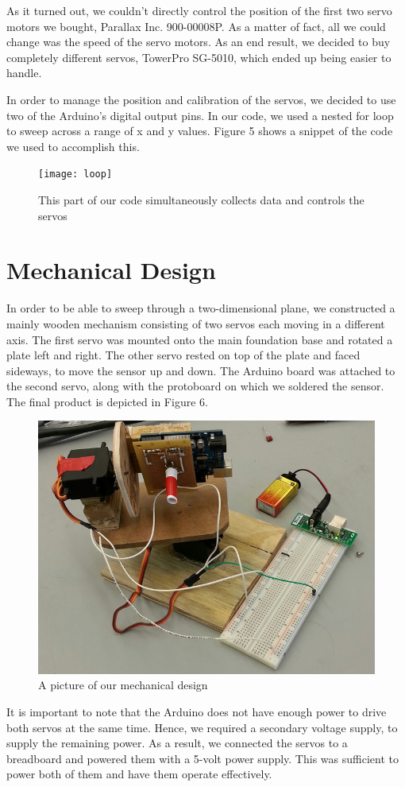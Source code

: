 \documentclass[11pt]{article}
\begin{document}
As it turned out, we couldn't directly control the position of the first two servo motors we bought, Parallax Inc.  900-00008P. As a matter of fact, all we could change was the speed of the servo motors. As an end result, we decided to buy completely different servos, TowerPro SG-5010, which ended up being easier to handle.

In order to manage the position and calibration of the servos,  we decided to use two of the Arduino's digital output pins. In our code, we used a nested for loop to sweep across a range of x and y values. Figure 5 shows a snippet of the code we used to accomplish this.

\begin{figure}[!ht]
    \centering
    \texttt{[image: loop]}
    \caption{This part of our code simultaneously collects data and controls the servos}
\end{figure}

\section{Mechanical Design}
In order to be able to sweep through a two-dimensional plane, we constructed a mainly wooden mechanism consisting of two servos each moving in a different axis. The first servo was mounted onto the main foundation base and rotated a plate left and right. The other servo rested on top of the plate and faced sideways, to move the sensor up and down. The Arduino board was attached to the second servo, along with the protoboard on which we soldered the sensor. The final product is depicted in Figure 6.

\begin{figure}[H]
    \centering
    \includegraphics[width=.6\textwidth]{mechdesign}
    \caption{A picture of our mechanical design}
\end{figure}

It is important to note that the Arduino does not have enough power to drive both servos at the same time. Hence, we required a secondary voltage supply, to supply the remaining power. As a result, we connected the servos to a breadboard and powered them with a 5-volt power supply. This was sufficient to power both of them and have them operate effectively.
\end{document}
